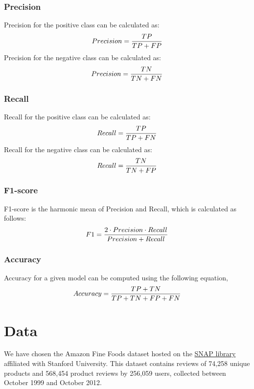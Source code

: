 \documentclass[11pt]{article}
\begin{document}
\subsubsection{Precision}
Precision for the positive class can be calculated as:
\begin{equation}
\small Precision =\frac{TP}{TP+FP}
\end{equation}
Precision for the negative class can be calculated as:
\begin{equation}
\small Precision =\frac{TN}{TN+FN}
\end{equation}
\subsubsection{Recall}
Recall for the positive class can be calculated as:
\begin{equation}
    \small Recall =\frac{TP}{TP+FN}
\end{equation}
Recall for the negative class can be calculated as:
\begin{equation}
    \small Recall =\frac{TN}{TN+FP}
\end{equation}

\subsubsection{F1-score}
F1-score is the harmonic mean of Precision and Recall, which is calculated as follows:
\begin{equation}
\small    F1  = \frac{2\cdot Precision\cdot  Recall}{Precision + Recall}
\end{equation}
\subsubsection{Accuracy}
Accuracy for a given model can be computed using the following equation,
\begin{equation}
    \small Accuracy = \frac{TP+TN}{TP+TN+FP+FN}
\end{equation}
 \section{Data}
 \label{sec:data}
 We have chosen the Amazon Fine Foods dataset hosted on the \href{https://snap.stanford.edu/about.html}{SNAP library} affiliated with Stanford University. This dataset contains reviews of 74,258 unique products and 568,454 product reviews by 256,059 users, collected between October 1999 and October 2012.
 
\end{document}
